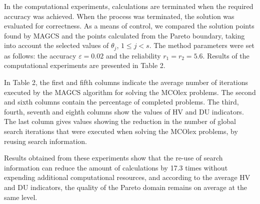 \documentclass[smallextended]{svjour3}       %
\begin{document}
In the computational experiments, calculations are terminated when the required accuracy was achieved. When the process was terminated, the solution was evaluated for correctness. As a means of control, we compared the solution points found by MAGCS and the points calculated from the Pareto boundary, taking into account the selected values of $\theta_j$, $1 \leq j < s$. The method parameters were set as follows: the accuracy $\varepsilon = 0.02$ and the reliability $r_1=r_2=5.6$. Results of the computational experiments are presented in Table 2.

In Table 2, the first and fifth columns indicate the average number of iterations executed by the MAGCS algorithm for solving the MCOlex problems. The second and sixth columns contain the percentage of completed problems. The third, fourth, seventh and eighth columns show the values of HV and DU indicators. The last column gives values showing the reduction in the number of global search iterations that were executed when solving the MCOlex problems, by reusing search information.


\begin{table}[ht]
\centering
\caption{Results of the series of experiments to solve two-dimensional two-criteria MCO problems}
\label{tab:2}
\end{table}


Results obtained from these experiments show that the re-use of search information can reduce the amount of calculations by 17.3 times without expending additional computational resources, and according to the average HV and DU indicators, the quality of the Pareto domain remains on average at the same level.
\end{document}
